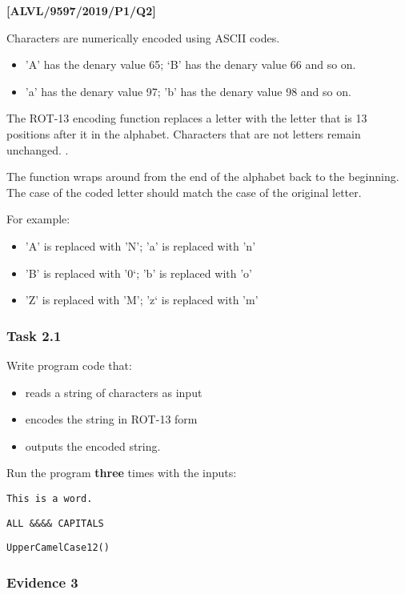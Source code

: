 \item \textbf{{[}ALVL/9597/2019/P1/Q2{]} }

Characters are numerically encoded using ASCII codes.
\begin{itemize}
\item 'A' has the denary value 65; \textquoteleft B' has the denary value
66 and so on.
\item 'a' has the denary value 97; 'b' has the denary value 98 and so on.
\end{itemize}
The ROT-13 encoding function replaces a letter with the letter that
is 13 positions after it in the alphabet. Characters that are not
letters remain unchanged. .

The function wraps around from the end of the alphabet back to the
beginning. The case of the coded letter should match the case of the
original letter.

For example:
\begin{itemize}
\item 'A' is replaced with 'N'; 'a' is replaced with 'n'
\item 'B' is replaced with '0\textquoteleft ; 'b' is replaced with 'o' 
\item 'Z' is replaced with 'M'; 'z\textquoteleft{} is replaced with 'm'
\end{itemize}

\subsubsection*{Task 2.1}

Write program code that:
\begin{itemize}
\item reads a string of characters as input
\item encodes the string in ROT-13 form
\item outputs the encoded string.
\end{itemize}
Run the program \textbf{three} times with the inputs: 

\noindent\begin{minipage}[t]{1\columnwidth}%
\texttt{This is a word.}

\texttt{ALL \&\&\&\& CAPITALS}

\texttt{UpperCamelCase12()}%
\end{minipage}

\subsubsection*{Evidence 3}

